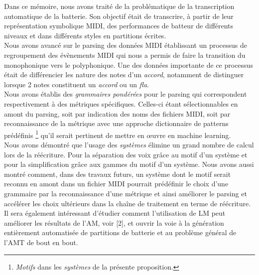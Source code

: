 Dans ce mémoire, nous avons traité de la problématique de la transcription automatique de la batterie. Son objectif était de transcrire, à partir de leur représentation symbolique MIDI, des performances de batteur de différents niveaux et dans différents styles en partitions écrites.\\
Nous avons avancé sur le parsing des données MIDI établissant un processus de regroupement des évènements MIDI qui nous a permis de faire la transition du monophonique vers le polyphonique. Une des données importante de ce processus était de différencier les nature des notes d’un \textit{accord}, notamment de distinguer lorsque 2 notes constituent un \textit{accord} ou un \textit{fla}.\\
Nous avons établis des \textit{grammaires pondérées} pour le parsing qui correspondent respectivement à des métriques spécifiques. Celles-ci étant sélectionnables en amont du parsing, soit par indication des noms des fichiers MIDI, soit par reconnaissance de la métrique avec une approche dictionnaire de patterns prédéfinis \footnote{\textit{Motifs} dans les \textit{systèmes} de la présente proposition.} qu’il serait pertinent de mettre en œuvre en machine learning.\\
Nous avons démontré que l’usage des \textit{systèmes} élimine un grand nombre de calcul lors de la réécriture. Pour la séparation des voix grâce au motif d’un système et pour la simplification grâce aux gammes du motif d’un système. Nous avons aussi montré comment, dans des travaux futurs, un système dont le motif serait reconnu en amont dans un fichier MIDI pourrait prédéfinir le choix d’une grammaire par la reconnaissance d’une métrique et ainsi améliorer le parsing et accélérer les choix ultérieurs dans la chaîne de traitement en terme de réécriture.\\
Il sera également intéressant d'étudier comment l'utilisation de LM peut améliorer les résultats de l'AM, voir [2], et ouvrir la voie à la génération entièrement automatisée de partitions de batterie et au problème général de l'AMT de bout en bout.\cite{future_directions}